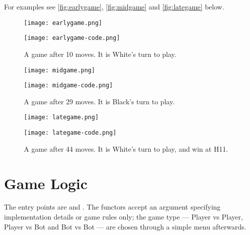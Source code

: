 \documentclass[12pt,a4paper,notitlepage]{article}
\begin{document}
For examples see \autoref{fig:earlygame}, \autoref{fig:midgame} and \autoref{fig:lategame} below.

\begin{figure}[bhtp]
	\centering
	\begin{minipage}{0.35\textwidth}
	\texttt{[image: earlygame.png]}
	\end{minipage}
	\begin{minipage}{0.45\textwidth}
		\texttt{[image: earlygame-code.png]}
	\end{minipage}
	\caption{A game after 10 moves. It is White's turn to play.}
	\label{fig:earlygame}
\end{figure}
\vspace*{-2\baselineskip}
\begin{figure}
	\centering
	\begin{minipage}{0.35\textwidth}
		\texttt{[image: midgame.png]}
	\end{minipage}
	\begin{minipage}{0.45\textwidth}
		\texttt{[image: midgame-code.png]}
	\end{minipage}
	\caption{A game after 29 moves. It is Black's turn to play.}
	\label{fig:midgame}
\end{figure}
\vspace*{-2\baselineskip}
\begin{figure}
	\centering
	\begin{minipage}{0.35\textwidth}
		\texttt{[image: lategame.png]}
	\end{minipage}
	\begin{minipage}{0.45\textwidth}
		\texttt{[image: lategame-code.png]}
	\end{minipage}
	\caption{A game after 44 moves. It is White's turn to play, and win at H11.}
	\label{fig:lategame}
\end{figure}

\section{Game Logic}
\label{sec:gamelogic}

The entry points are  and . The functors accept an  argument specifying implementation details or game rules only; the game type --- Player vs Player, Player vs Bot and Bot vs Bot --- are chosen through a simple menu afterwards.
\end{document}

